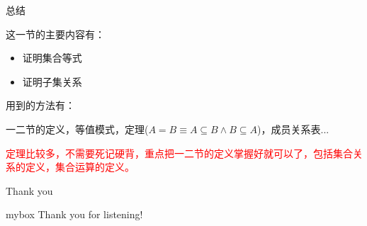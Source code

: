 \documentclass[xetex,10pt,aspectratio=43]{beamer}
\begin{document}
	\begin{frame}{总结}
	
	这一节的主要内容有：
	
	\begin{itemize}
		
		\item<1> 证明集合等式
		
		\item<1> 证明子集关系
		
	\end{itemize}

	
	\vspace{0.5cm}

	用到的方法有：
	
	一二节的定义，等值模式，定理($A=B\equiv A\subseteq B\wedge B\subseteq A$)，成员关系表...
		
	\vspace{0.5cm}
	
	\textcolor{red}{定理比较多，不需要死记硬背，重点把一二节的定义掌握好就可以了，包括集合关系的定义，集合运算的定义。}
	
	\end{frame}
	
	\begin{frame}{Thank you}
		\begin{center}
			\begin{minipage}{\textwidth}
				\begin{beamercolorbox}[wd=0.70\textwidth, rounded=true, shadow=true]{mybox}
					\LARGE \centering Thank you for listening!  %
				\end{beamercolorbox}
			\end{minipage}
		\end{center}
	\end{frame}
	
	
\end{document}
